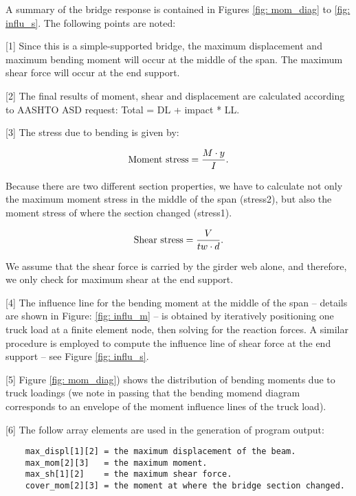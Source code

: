 \vspace{0.15 in}\noindent
A summary of the bridge response is contained
in Figures \ref{fig: mom_diag} to \ref{fig: influ_s}.
The following points are noted:

\begin{description}
\item{[1]}
Since this is a simple-supported bridge, the maximum displacement and
maximum bending moment will occur at the middle of the span.
The maximum shear force will occur at the end support.

\item{[2]}
The final results of moment, shear and displacement are calculated
according to AASHTO ASD request: Total = DL + impact * LL.

\item{[3]}
The stress due to bending is given by:

\begin{equation}
\hbox{Moment stress} = {{M \cdot y} \over I}.
\label{eq: working-check-part1}
\end{equation}

Because there are two different section properties, we have to calculate
not only the maximum moment stress in the middle of the span (stress2),
but also the moment stress of where the section changed (stress1).

\begin{equation}
\hbox{Shear stress}  = {V \over {tw \cdot d}}.
\label{eq: working-check-part2}
\end{equation}

We assume that the shear force is carried by the girder web alone,
and therefore, we only check for maximum shear at the end support.

\item{[4]}
The influence line for the bending moment at the middle
of the span -- details are shown in Figure: \ref{fig: influ_m} -- is obtained
by iteratively positioning one truck load at a finite element node,
then solving for the reaction forces.
A similar procedure is employed to compute
the influence line of shear force at the end support -- 
see Figure \ref{fig: influ_s}.

\item{[5]}
Figure \ref{fig: mom_diag}) shows the distribution of
bending moments due to truck loadings (we note in passing that
the bending momend diagram corresponds to
an envelope of the moment influence lines of the truck load).

\item{[6]}
The follow array elements are used in the generation of
program output:

\begin{footnotesize}
\begin{verbatim}
    max_displ[1][2] = the maximum displacement of the beam.
    max_mom[2][3]   = the maximum moment.
    max_sh[1][2]    = the maximum shear force.
    cover_mom[2][3] = the moment at where the bridge section changed.
\end{verbatim}
\end{footnotesize}
\end{description}

